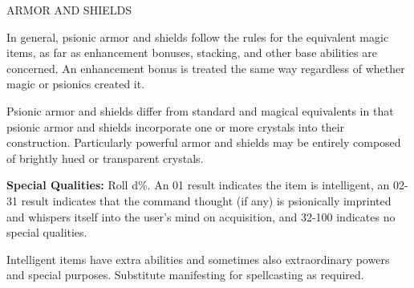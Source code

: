 \documentclass{article}
\begin{document}
\vspace{12pt}
ARMOR AND SHIELDS

In general, psionic armor and shields follow the rules for the equivalent magic 
items, as far as enhancement bonuses, stacking, and other base abilities are concerned. 
An enhancement bonus is treated the same way regardless of whether magic or psionics 
created it.

Psionic armor and shields differ from standard and magical equivalents in that 
psionic armor and shields incorporate one or more crystals into their construction. 
Particularly powerful armor and shields may be entirely composed of brightly hued 
or transparent crystals.

\textbf{Special Qualities:} Roll d\%. An 01 result indicates the item is intelligent, 
an 02-31 result indicates that the command thought (if any) is psionically imprinted 
and whispers itself into the user's mind on acquisition, and 32-100 indicates no 
special qualities.

Intelligent items have extra abilities and sometimes also extraordinary powers 
and special purposes. Substitute manifesting for spellcasting as required.
\end{document}
